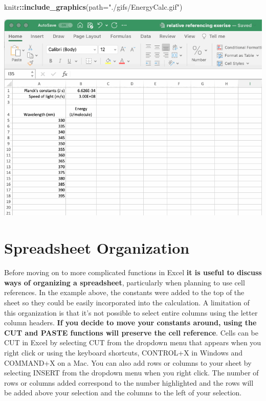 \documentclass[
]{book}
\newenvironment{Shaded}{\begin{snugshade}}{\end{snugshade}}
\newcommand{\AttributeTok}[1]{\textcolor[rgb]{0.13,0.29,0.53}{#1}}
\newcommand{\FunctionTok}[1]{\textcolor[rgb]{0.13,0.29,0.53}{\textbf{#1}}}
\newcommand{\NormalTok}[1]{#1}
\newcommand{\SpecialCharTok}[1]{\textcolor[rgb]{0.81,0.36,0.00}{\textbf{#1}}}
\newcommand{\StringTok}[1]{\textcolor[rgb]{0.31,0.60,0.02}{#1}}
\begin{document}
\begin{Shaded}
\begin{Highlighting}[]
\NormalTok{knitr}\SpecialCharTok{::}\FunctionTok{include\_graphics}\NormalTok{(}\AttributeTok{path=}\StringTok{"./gifs/EnergyCalc.gif"}\NormalTok{)}
\end{Highlighting}
\end{Shaded}

\includegraphics{./gifs/EnergyCalc.gif}

\hypertarget{spreadsheet-organization}{%
\section{Spreadsheet Organization}\label{spreadsheet-organization}}

Before moving on to more complicated functions in Excel \textbf{it is useful to discuss ways of organizing a spreadsheet}, particularly when planning to use cell references. In the example above, the constants were added to the top of the sheet so they could be easily incorporated into the calculation. A limitation of this organization is that it's not possible to select entire columns using the letter column headers. \textbf{If you decide to move your constants around, using the CUT and PASTE functions will preserve the cell reference}. Cells can be CUT in Excel by selecting CUT from the dropdown menu that appears when you right click or using the keyboard shortcuts, CONTROL+X in Windows and COMMAND+X on a Mac. You can also add rows or columns to your sheet by selecting INSERT from the dropdown menu when you right click. The number of rows or columns added correspond to the number highlighted and the rows will be added above your selection and the columns to the left of your selection.
\end{document}

